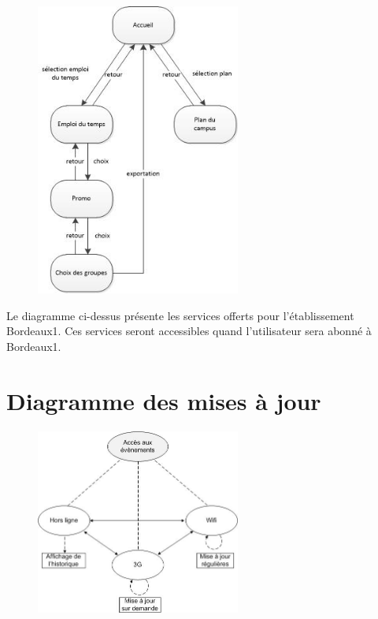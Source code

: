 \documentclass [pdftex,12pt] {report}
\begin{document}
\begin{figure}[h]
	\center
	\includegraphics[width=0.6\textwidth]{resources/features2.jpg}
\end{figure}

Le diagramme ci-dessus présente les services offerts pour l'établissement Bordeaux1. Ces services seront accessibles quand l'utilisateur sera abonné à Bordeaux1.

\section{Diagramme des mises à jour}

\begin{figure}[h]
  \center
  \includegraphics[width=0.6\textwidth]{resources/state_diagram.jpg}
\end{figure}
\end{document}
